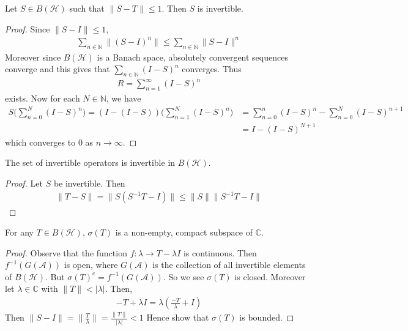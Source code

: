 \begin{lemma}
  Let $S \in B(\mathcal{H})$ such that $\|S - T\| \le 1$. Then $S$ is
  invertible.
\end{lemma}
\begin{proof}
  Since $\|S  -I\| \le 1$,
  \begin{align*}
    \sum_{n \in \mathbb{N}} \|(S-I)^n\| \le \sum_{n \in \mathbb{N}} \|S - I\|^n
  \end{align*}
  Moreover since $B(\mathcal{H})$ is a Banach space, absolutely
  convergent sequences converge and this gives that
  $\sum_{n \in \mathbb{N}} (I - S)^n$ converges. Thus
  \begin{align*}
    R = \sum_{n=1}^\infty (I - S)^n
  \end{align*}
  exists. Now for each $N \in \mathbb{N}$, we have
  \begin{align*}
    S \Big(\sum_{n = 0}^{N} (I - S)^n\Big) = (I - (I -
    S))\Big(\sum_{n = 1}^{N} (I - S)^n\Big) &= \sum_{n = 0}^{n} (I -
    S)^n - \sum_{n = 0}^{N} (I-S)^{n+1}\\
    &= I - (I-S)^{N+1}
  \end{align*}
  which converges to $0$ as $n \to \infty$.
\end{proof}

\begin{corollary}
  The set of invertible operators is invertible in $B(\mathcal{H})$.
\end{corollary}
\begin{proof}
  Let $S$ be invertible. Then
  \begin{align*}
    \|T - S\| = \|S(S^{-1}T - I)\| \le \| S\| \|S^{-1}T - I\|
  \end{align*}
\end{proof}

\begin{theorem}
  For any $T \in B(\mathcal{H})$, $\sigma(T)$ is a non-empty, compact
  subspace of $\mathbb{C}$.
\end{theorem}
\begin{proof}
  Observe that the function $f: \lambda \to T - \lambda I$ is
  continuous. Then $f^{-1}(G(\mathcal{A}))$ is open, where
  $G(\mathcal{A})$ is the collection of all invertible elements of
  $B(\mathcal{H})$. But $\sigma(T)^{c} = f^{-1}(G(\mathcal{A}))$.
  So we see $\sigma(T)$ is closed. Moreover let $\lambda \in
  \mathbb{C}$ with $\|T\| < |\lambda|$. Then,
  \begin{align*}
    -T + \lambda I = \lambda(\frac{-T}{\lambda} + I)
  \end{align*}
  Then $\|S - I\| = \| \frac{T}{\lambda}\| = \frac{\|T\|}{|\lambda|} < 1$
  Hence show that $\sigma(T)$ is bounded.
\end{proof}
